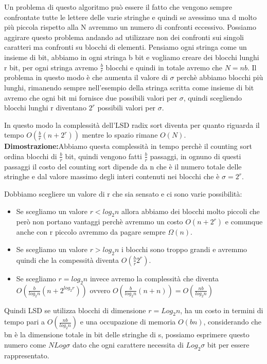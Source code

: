 \documentclass[14pt]{extreport}
\begin{document}
Un problema di questo algoritmo può essere il fatto che vengono sempre confrontate tutte le lettere delle varie stringhe e quindi se avessimo una d molto più piccola rispetto alla N avremmo un numero di confronti eccessivo.
Possiamo aggirare questo problema andando ad utilizzare non dei confronti sui singoli caratteri ma confronti su blocchi di elementi.
Pensiamo ogni stringa come un insieme di bit, abbiamo in ogni stringa b bit e vogliamo creare dei blocchi lunghi r bit, per ogni stringa avremo $\frac{b}{r}$ blocchi e quindi in totale avremo che $N=nb$. Il problema in questo modo è che aumenta il valore di $\sigma$ perchè abbiamo blocchi più lunghi, rimanendo sempre nell'esempio della stringa scritta come insieme di bit avremo che ogni bit mi fornisce due possibili valori per $\sigma$, quindi scegliendo blocchi lunghi r diventano $2^{r}$ possibili valori per $\sigma$.

In questo modo la complessità dell'LSD radix sort diventa per quanto riguarda il tempo $O(\frac{b}{r}(n+2^r))$ mentre lo spazio rimane $O(N)$.
\newline
\textbf{Dimostrazione:}Abbiamo questa complessità in tempo perchè il counting sort ordina blocchi di $\frac{b}{r}$ bit, quindi vengono fatti $\frac{b}{r}$ passaggi, in ognuno di questi passaggi il costo del counting sort dipende da n che è il numero totale delle stringhe e dal valore massimo degli interi contenuti nei blocchi che è $\sigma = 2^r$.

Dobbiamo scegliere un valore di r che sia sensato e ci sono varie possibilità:
\begin{itemize}
\item Se scegliamo un valore $r<log_2 n$ allora abbiamo dei blocchi molto piccoli che però non portano vantaggi perchè avremmo un costo $O(n+2^r)$ e comunque anche con r piccolo avremmo da pagare sempre $\Omega(n)$.
\item Se scegliamo un valore $r>log_2 n$ i blocchi sono troppo grandi e avremmo quindi che la compessità diventa $O(\frac{b}{r}2^r)$.
\item Se scegliamo $r=log_2 n$ invece avremo la complessità che diventa $O(\frac{b}{log_2 n}(n+2^{log_2 r}))$ ovvero $O(\frac{b}{log_2 n}(n+n)) = O(\frac{nb}{log_2 n})$ 
\end{itemize}

Quindi LSD se utilizza blocchi di dimensione $r=Log_2 n$, ha un costo in termini di tempo pari a $O(\frac{nb}{log_2 n})$ e una occupazione di memoria $O(bn)$, considerando che bn è la dimensione totale in bit delle stringhe di s, possiamo esprimere questo numero come $NLog\sigma$ dato che ogni carattere necessita di $Log_2 \sigma$ bit per essere rappresentato.
\end{document}

